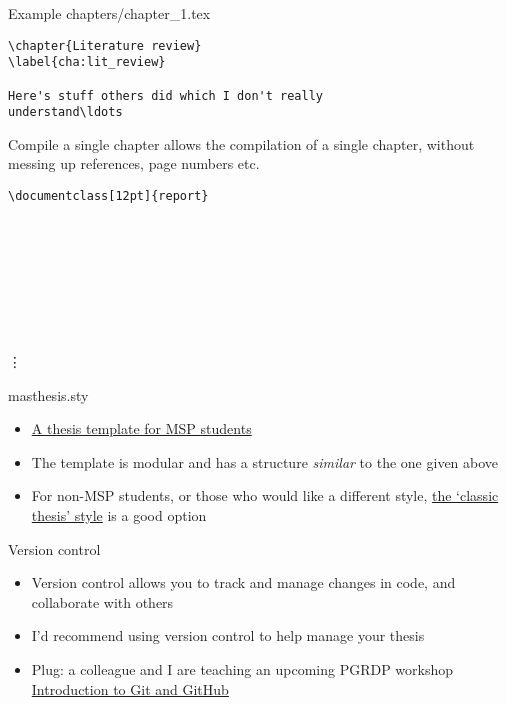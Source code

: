 \begin{frame}[fragile]{Example chapters/chapter\_1.tex}
  \begin{lstlisting}
\chapter{Literature review}
\label{cha:lit_review}

Here's stuff others did which I don't really
understand\ldots
  \end{lstlisting}
\end{frame}

\begin{frame}[fragile]{Compile a single chapter}
  \lstinline|| allows the compilation of a single chapter,
  without messing up references, page numbers etc.
  \begin{lstlisting}
\documentclass[12pt]{report}









  \end{lstlisting}
  \vspace{-0.2cm}\vdots
\end{frame}

\begin{frame}{masthesis.sty}
  \begin{itemize}
    \item \href{https://wiki.mas.ncl.ac.uk/mas/ThesisTemplate?highlight=\%28masthesis\%29}%
      {A thesis template for MSP students}
    \item The template is modular and has a structure \emph{similar} to the one
      given above
    \item For non-MSP students, or those who would like a different style, 
      \href{https://ctan.org/pkg/classicthesis?lang=en}%
      {the `classic thesis' style} is a good option
  \end{itemize}
\end{frame}

\begin{frame}{Version control}
  \begin{itemize}
    \item Version control allows you to track and manage changes in code, and
      collaborate with others
    \item I'd recommend using version control to help manage your thesis
    \item Plug: a colleague and I are teaching an upcoming PGRDP workshop
      \href{https://workshops.ncl.ac.uk/view/book/modal/43153/}%
      {Introduction to Git and GitHub}
  \end{itemize}
\end{frame}


